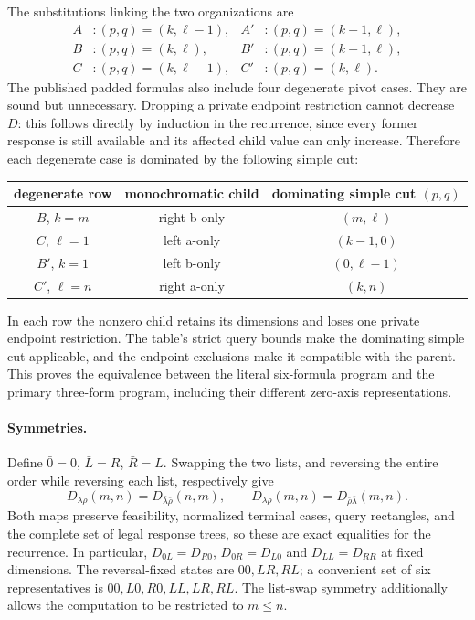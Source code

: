 \documentclass[11pt]{article}
\theoremstyle{definition}
\theoremstyle{remark}
\begin{document}
The substitutions linking the two organizations are
\begin{align*}
 A &: (p,q)=(k,\ell-1),& A' &: (p,q)=(k-1,\ell),\\
 B &: (p,q)=(k,\ell),& B' &: (p,q)=(k-1,\ell),\\
 C &: (p,q)=(k,\ell-1),& C' &: (p,q)=(k,\ell).
\end{align*}
The published padded formulas also include four degenerate pivot cases.
They are sound but unnecessary.  Dropping a private endpoint restriction
cannot decrease $D$: this follows directly by induction in the recurrence,
since every former response is still available and its affected child
value can only increase.  Therefore each degenerate case is dominated
by the following simple cut:
\begin{center}
\begin{tabular}{c|c|c}
degenerate row & monochromatic child & dominating simple cut $(p,q)$\\ \hline
$B$, $k=m$ & right b-only & $(m,\ell)$\\
$C$, $\ell=1$ & left a-only & $(k-1,0)$\\
$B'$, $k=1$ & left b-only & $(0,\ell-1)$\\
$C'$, $\ell=n$ & right a-only & $(k,n)$
\end{tabular}
\end{center}
In each row the nonzero child retains its dimensions and loses one
private endpoint restriction.  The table's strict query bounds make the
dominating simple cut applicable, and the endpoint exclusions make it
compatible with the parent.  This proves the equivalence between the
literal six-formula program and the primary three-form program, including
their different zero-axis representations.

\paragraph{Symmetries.}
Define $\bar0=0$, $\bar L=R$, $\bar R=L$.  Swapping the two lists, and
reversing the entire order while reversing each list, respectively give
\[
 D_{\lambda\rho}(m,n)=D_{\bar\lambda\bar\rho}(n,m),\qquad
 D_{\lambda\rho}(m,n)=D_{\bar\rho\bar\lambda}(m,n).
\]
Both maps preserve feasibility, normalized terminal cases, query
rectangles, and the complete set of legal response trees, so these are
exact equalities for the recurrence.  In particular,
$D_{0L}=D_{R0}$, $D_{0R}=D_{L0}$ and $D_{LL}=D_{RR}$ at fixed dimensions.
The reversal-fixed states are $00,LR,RL$; a convenient set of six
representatives is $00,L0,R0,LL,LR,RL$.  The list-swap symmetry additionally
allows the computation to be restricted to $m\le n$.
\end{document}
